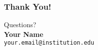 \documentclass{beamer}
\begin{document}
\begin{frame}
	\frametitle{Thank You!}
	\begin{center}
		Questions?\\[1em]
		\textbf{Your Name}\\[0.5em]
		\texttt{your.email@institution.edu}
	\end{center}
	\vfill
	\hyperlink{contents}{}
\end{frame}
\end{document}
